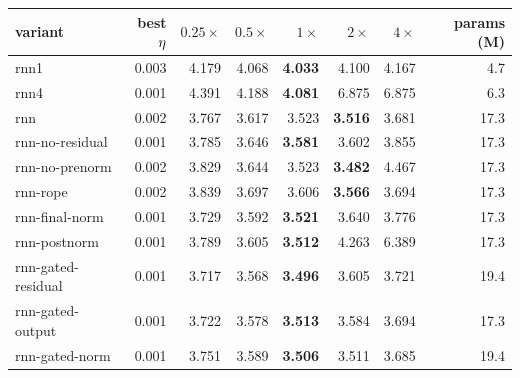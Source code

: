 \begin{tabular}{lrrrrrrr}\toprule
variant & best $\eta$ & $0.25\times$ & $0.5\times$ & $1\times$ & $2\times$ & $4\times$ & params (M)\\\midrule
rnn1 & 0.003 & 4.179 & 4.068 & \textbf{4.033} & 4.100 & 4.167 & 4.7 \\
rnn4 & 0.001 & 4.391 & 4.188 & \textbf{4.081} & 6.875 & 6.875 & 6.3 \\
rnn & 0.002 & 3.767 & 3.617 & 3.523 & \textbf{3.516} & 3.681 & 17.3 \\
rnn-no-residual & 0.001 & 3.785 & 3.646 & \textbf{3.581} & 3.602 & 3.855 & 17.3 \\
rnn-no-prenorm & 0.002 & 3.829 & 3.644 & 3.523 & \textbf{3.482} & 4.467 & 17.3 \\
rnn-rope & 0.002 & 3.839 & 3.697 & 3.606 & \textbf{3.566} & 3.694 & 17.3 \\
rnn-final-norm & 0.001 & 3.729 & 3.592 & \textbf{3.521} & 3.640 & 3.776 & 17.3 \\
rnn-postnorm & 0.001 & 3.789 & 3.605 & \textbf{3.512} & 4.263 & 6.389 & 17.3 \\
rnn-gated-residual & 0.001 & 3.717 & 3.568 & \textbf{3.496} & 3.605 & 3.721 & 19.4 \\
rnn-gated-output & 0.001 & 3.722 & 3.578 & \textbf{3.513} & 3.584 & 3.694 & 17.3 \\
rnn-gated-norm & 0.001 & 3.751 & 3.589 & \textbf{3.506} & 3.511 & 3.685 & 19.4 \\
\bottomrule\end{tabular}
